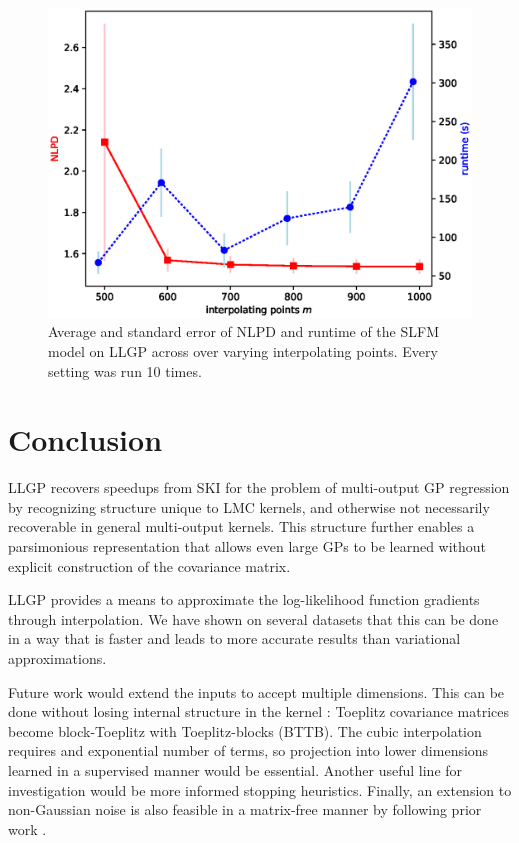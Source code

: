 \documentclass{article}
\begin{document}
\begin{figure}[!ht]
\vskip 0.1in
\begin{center}
\centerline{\includegraphics[width=\columnwidth]{m_time_nlpd.eps}}
\caption{Average and standard error of NLPD and runtime of the SLFM model on LLGP across over varying interpolating points. Every setting was run 10 times.}
\label{fig:llgpweather}
\end{center}
\vskip -0.1in
\end{figure}
\section{Conclusion}\label{conclusion}

LLGP recovers speedups from SKI \cite{kiss-gp} for the problem of multi-output GP regression by recognizing structure unique to LMC kernels, and otherwise not necessarily recoverable in general multi-output kernels. This structure further enables a parsimonious representation that allows even large GPs to be learned without explicit construction of the covariance matrix.

LLGP provides a means to approximate the log-likelihood function gradients through interpolation. We have shown on several datasets that this can be done in a way that is faster and leads to more accurate results than variational approximations.

Future work would extend the inputs to accept multiple dimensions. This can be done without losing internal structure in the kernel \cite{msgp}: Toeplitz covariance matrices become block-Toeplitz with Toeplitz-blocks (BTTB). The cubic interpolation requires and exponential number of terms, so projection into lower dimensions learned in a supervised manner would be essential. Another useful line for investigation would be more informed stopping heuristics. Finally, an extension to non-Gaussian noise is also feasible in a matrix-free manner by following prior work \cite{cutajar2016preconditioning}.


\end{document}
